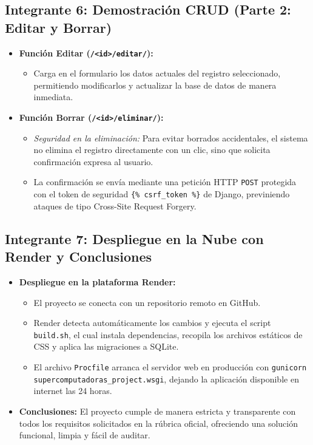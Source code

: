 \documentclass[11pt,a4paper]{article}
\begin{document}
\subsection{Integrante 6: Demostración CRUD (Parte 2: Editar y Borrar)}
\begin{itemize}
    \item \textbf{Función Editar (\texttt{/<id>/editar/}):}
    \begin{itemize}
        \item Carga en el formulario los datos actuales del registro seleccionado, permitiendo modificarlos y actualizar la base de datos de manera inmediata.
    \end{itemize}
    \item \textbf{Función Borrar (\texttt{/<id>/eliminar/}):}
    \begin{itemize}
        \item \textit{Seguridad en la eliminación:} Para evitar borrados accidentales, el sistema no elimina el registro directamente con un clic, sino que solicita confirmación expresa al usuario.
        \item La confirmación se envía mediante una petición HTTP \texttt{POST} protegida con el token de seguridad \texttt{\{\% csrf\_token \%\}} de Django, previniendo ataques de tipo Cross-Site Request Forgery.
    \end{itemize}
\end{itemize}

\subsection{Integrante 7: Despliegue en la Nube con Render y Conclusiones}
\begin{itemize}
    \item \textbf{Despliegue en la plataforma Render:}
    \begin{itemize}
        \item El proyecto se conecta con un repositorio remoto en GitHub.
        \item Render detecta automáticamente los cambios y ejecuta el script \texttt{build.sh}, el cual instala dependencias, recopila los archivos estáticos de CSS y aplica las migraciones a SQLite.
        \item El archivo \texttt{Procfile} arranca el servidor web en producción con \texttt{gunicorn supercomputadoras\_project.wsgi}, dejando la aplicación disponible en internet las 24 horas.
    \end{itemize}
    \item \textbf{Conclusiones:} El proyecto cumple de manera estricta y transparente con todos los requisitos solicitados en la rúbrica oficial, ofreciendo una solución funcional, limpia y fácil de auditar.
\end{itemize}
\end{document}
